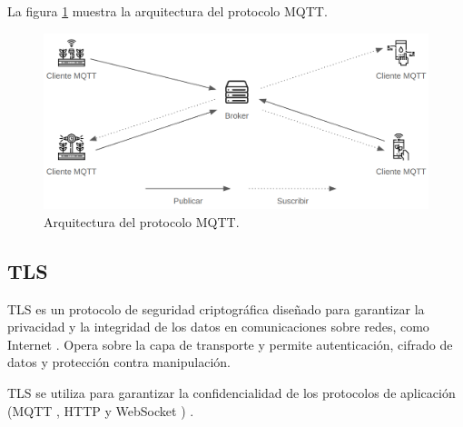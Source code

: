 La figura \ref{fig:MqttProtocol} muestra la arquitectura del protocolo MQTT.

\begin{figure}[H]
	\centering
	\includegraphics[width=.99\textwidth]{./Images/2.png}
	\caption{Arquitectura del protocolo MQTT.}
	\label{fig:MqttProtocol}
\end{figure}

\subsection{TLS}

TLS es un protocolo de seguridad criptográfica diseñado para garantizar la
privacidad y la integridad de los datos en comunicaciones sobre redes, como
Internet \cite{tls}. Opera sobre la capa de transporte y permite autenticación,
cifrado de datos y protección contra manipulación.

TLS se utiliza para garantizar la confidencialidad de los protocolos de
aplicación (MQTT \cite{OASIS_MQTT_Standard}, HTTP \cite{IBMTCPIP} y WebSocket
\cite{RFC6455}) \cite{awsiot_tls}.





